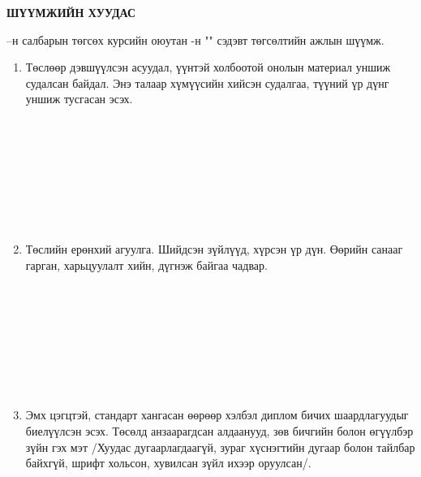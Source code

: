 \begin{titlepage}
\begin{center}

{\scshape\Large \univname\par} %
{\scshape\large \facname\par}\vspace{1cm} %

\textbf{{\Large ШҮҮМЖИЙН ХУУДАС}}\\[1cm]

\end{center}

\normalsize

\deptname --н салбарын төгсөх курсийн оюутан \shortname -н "\ttitle" сэдэвт төгсөлтийн ажлын шүүмж.

\begin{enumerate}
\item Төслөөр дэвшүүлсэн асуудал, үүнтэй холбоотой онолын материал уншиж судалсан байдал. Энэ талаар хүмүүсийн хийсэн судалгаа, түүний үр дүнг уншиж тусгасан эсэх.
\begin{center}
\dotfill \\[0.1cm]
\dotfill \\[0.1cm]
\dotfill \\[0.1cm]
\dotfill \\[0.1cm]
\dotfill \\[0.1cm]
\dotfill \\[0.1cm]
\dotfill \\[0.4cm]
\end{center}
\item Төслийн ерөнхий агуулга. Шийдсэн зүйлүүд, хүрсэн үр дүн. Өөрийн санааг гарган, харьцуулалт хийн, дүгнэж байгаа чадвар.
\begin{center}
\dotfill \\[0.1cm]
\dotfill \\[0.1cm]
\dotfill \\[0.1cm]
\dotfill \\[0.1cm]
\dotfill \\[0.1cm]
\dotfill \\[0.1cm]
\dotfill \\[0.4cm]
\end{center}
\item Эмх цэгцтэй, стандарт хангасан өөрөөр хэлбэл диплом бичих шаардлагуудыг биелүүлсэн эсэх. Төсөлд анзаарагдсан алдаанууд, зөв бичгийн болон өгүүлбэр зүйн гэх мэт /Хуудас дугаарлагдаагүй, зураг хүснэгтийн дугаар болон тайлбар байхгүй, шрифт хольсон, хувилсан зүйл ихээр оруулсан/.

\end{enumerate}
\end{titlepage}
